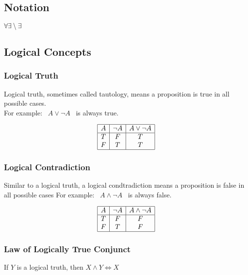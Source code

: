 \documentclass[a4paper]{article}
\begin{document}
\subsection{Notation}
$\forall
\\
\exists
\setminus
\exists \!
$
\subsection{Logical Concepts}
\subsubsection{Logical Truth}
Logical truth, sometimes called tautology, means a proposition is true in all possible cases. \\
For example: \ $A \lor \lnot A$ \ is always true. 
\begin{center}
	\begin{displaymath}
		\begin{array}{|c|c|c|}
			\hline
			A & \lnot A & A \lor \lnot A \\ 
			\hline
			T & F & T\\
			F & T & T\\
			\hline
		\end{array}
	\end{displaymath}
\end{center}

\subsubsection{Logical Contradiction}
Similar to a logical truth, a logical condtradiction means a proposition is false in all possible cases
For example: \ $A \land \lnot A$ \ is always false. 
\begin{center}
	\begin{displaymath}
		\begin{array}{|c|c|c|}
			\hline
			A & \lnot A & A \land \lnot A \\ 
			\hline
			T & F & F\\
			F & T & F\\
			\hline
		\end{array}
	\end{displaymath}
\end{center}

\subsubsection{Law of Logically True Conjunct}
If $Y$ is a logical truth, then $X \land Y \Leftrightarrow X$
\end{document}

